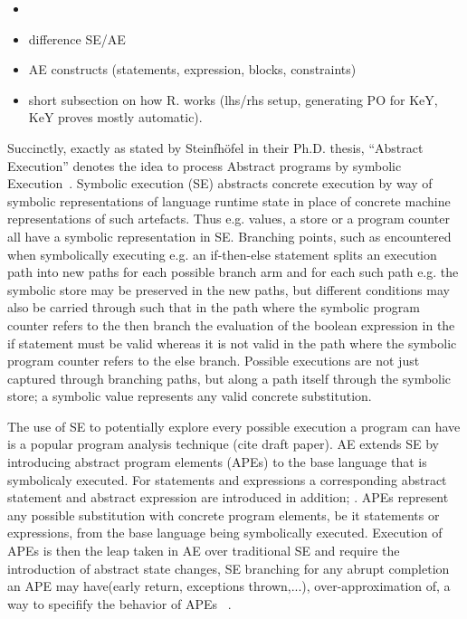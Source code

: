 \begin{itemize}
\item {}
\item difference SE/AE
\item AE constructs (statements, expression, blocks, constraints)
\item short subsection on how R. works (lhs/rhs setup, generating PO
  for KeY, KeY proves mostly automatic).
\end{itemize}


Succinctly, exactly as stated by Steinfhöfel in their Ph.D. thesis, “Abstract Execution” denotes the idea to process Abstract programs by symbolic Execution~\cite{steinhoefel-20}.
Symbolic execution (SE) \cite{DBLP:journals/csur/BaldoniCDDF18,DBLP:journals/ac/YangFBCW19} abstracts concrete execution by way of symbolic representations of language runtime
state in place of concrete machine representations of such artefacts.
Thus e.g. values, a store or a program counter all have a symbolic representation in SE.
Branching points, such as encountered when symbolically executing e.g. an if-then-else statement splits an execution path into new paths for each possible branch arm and for each such
path e.g. the symbolic store may be preserved in the new paths, but different conditions may also be carried through such that in the path where the symbolic program counter refers
to the then branch the evaluation of the boolean expression in the if statement must be valid whereas it is not valid in the path where the symbolic program counter refers to the else branch.
Possible executions are not just captured through branching paths, but along a path itself through the symbolic store; a symbolic value represents any valid concrete substitution.

The use of SE to potentially explore every possible execution a program can have is a popular program analysis technique (cite draft paper). AE extends SE by
introducing abstract program elements (APEs) to the base language that is symbolicaly executed.
For statements and expressions a corresponding abstract statement and abstract expression are introduced in addition; .
APEs represent any possible substitution with concrete program elements, be it statements or expressions, from the base language being symbolically executed.
Execution of APEs is then the leap taken in AE over traditional SE and require the introduction of abstract state changes, SE branching for
any abrupt completion an APE may have(early return, exceptions thrown,...), over-approximation of, a way to specifify the behavior of APEs ~\cite{steinhoefel-20}.

